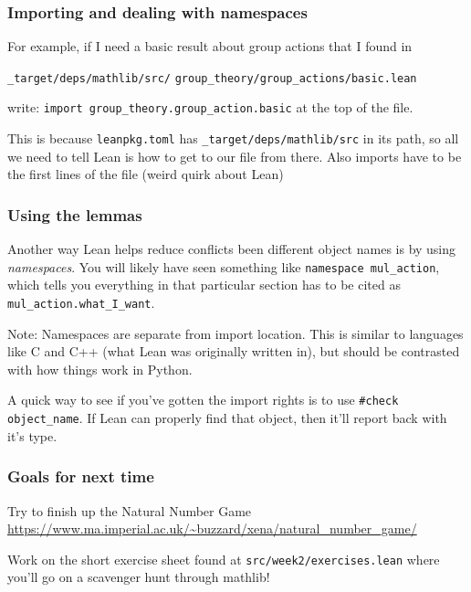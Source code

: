 \documentclass{beamer}
\begin{document}
\begin{frame}[fragile]
    \frametitle{Importing and dealing with namespaces}

    For example, if I need a basic result about group actions that I found in 

    \verb!_target/deps/mathlib/src/! \verb!group_theory/group_actions/basic.lean!
    
    write:
    \verb!import group_theory.group_action.basic! at the top of the file.
    \vspace{10pt}
    \pause

    This is because \verb!leanpkg.toml! has \verb!_target/deps/mathlib/src! in its path, so all we need to tell Lean is how to get to our file from there. 
    \pause
    Also imports have to be the first lines of the file (weird quirk about Lean)

\end{frame}

\begin{frame}[fragile]
    \frametitle{Using the lemmas}
    Another way Lean helps reduce conflicts been different object names is by using \emph{namespaces}. 
    You will likely have seen something like \verb!namespace mul_action!, which tells you everything in that particular section has to be cited as \verb!mul_action.what_I_want!.
    \vspace{10pt} 
    \pause

    Note: Namespaces are separate from import location. This is similar to languages like C and C++ (what Lean was originally written in), but should be contrasted with how things work in Python.
    \vspace{10pt}
    \pause

    A quick way to see if you've gotten the import rights is to use \verb!#check object_name!. If Lean can properly find that object, then it'll report back with it's type. 
\end{frame}

\begin{frame}[fragile]
    \frametitle{Goals for next time}

    Try to finish up the Natural Number Game \url{https://www.ma.imperial.ac.uk/~buzzard/xena/natural_number_game/}
    \vspace{20pt}

    Work on the short exercise sheet found at \verb!src/week2/exercises.lean! where you'll go on a scavenger hunt through mathlib!
\end{frame}
\end{document}
